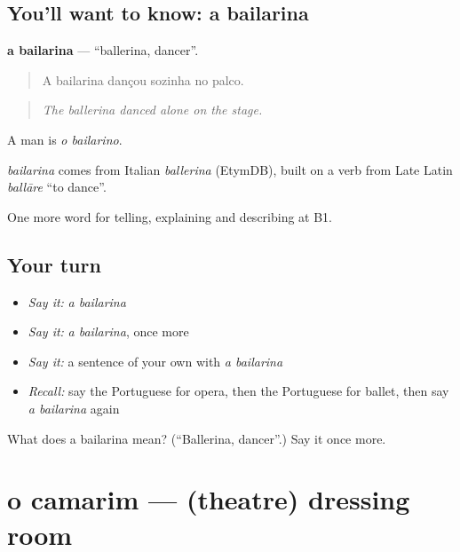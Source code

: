 \subsection*{You'll want to know: a bailarina}
\textbf{a bailarina} — \textquotedblleft{}ballerina, dancer\textquotedblright{}.

\begin{quote}
A bailarina dançou sozinha no palco.
\end{quote}

\begin{quote}
\emph{The ballerina danced alone on the stage.}
\end{quote}

A man is \emph{o bailarino}.

\begin{cousinweb}
\emph{bailarina} comes from Italian \emph{ballerina} (EtymDB), built on a verb from Late Latin \emph{ballāre} \textquotedblleft{}to dance\textquotedblright{}.
\end{cousinweb}

\begin{grammarlens}[title={What you've built}]
One more word for telling, explaining and describing at B1.
\end{grammarlens}

\subsection*{Your turn}
\begin{itemize}
\raggedright
  \item \emph{Say it:} \emph{a bailarina}
  \item \emph{Say it:} \emph{a bailarina}, once more
  \item \emph{Say it:} a sentence of your own with \emph{a bailarina}
  \item \emph{Recall:} say the Portuguese for opera, then the Portuguese for ballet, then say \emph{a bailarina} again
\end{itemize}

\begin{tcolorbox}[breakable,colback=teal!4,colframe=teal!35!black,title={Before you move on}]
What does a bailarina mean? (\textquotedblleft{}Ballerina, dancer\textquotedblright{}.) Say it once more.
\end{tcolorbox}
\section[o camarim]{o camarim — (theatre) dressing room}

